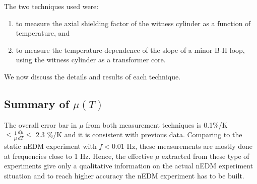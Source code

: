 \documentclass[review]{elsarticle}
\begin{document}

The two techniques used were:
\begin{enumerate}
\item to measure the axial shielding factor of the witness cylinder as
  a function of temperature, and
\item to measure the temperature-dependence of the slope of a minor
  B-H loop, using the witness cylinder as a transformer core.
\end{enumerate}
We now discuss the details and results of each technique.







\subsection{Summary of $\mu(T)$}
The overall error bar in $\mu$ from both measurement techniques is 0.1\%/K $\leq \frac{1}{\mu}\frac{d\mu}{dT} \leq$ 2.3 \%/K and it is consistent with previous data.
Comparing to the static nEDM experiment with $f < 0.01$ Hz, these measurements are mostly done at frequencies close to 1 Hz. Hence, the effective $\mu$ extracted from these type of experiments give
only a qualitative information on the actual nEDM experiment situation and to reach higher accuracy the nEDM experiment has to be built. 
\end{document}
